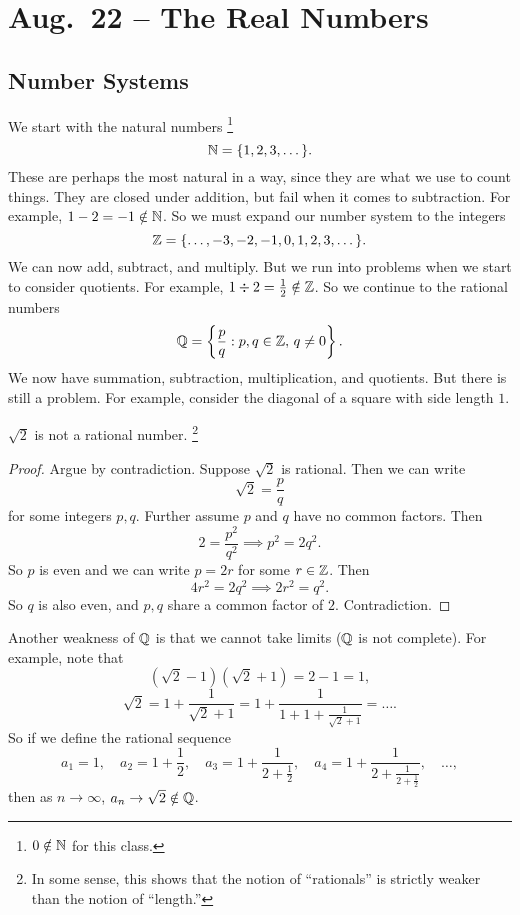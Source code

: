 \chapter{Aug.~22 -- The Real Numbers}

\section{Number Systems}
We start with the natural numbers
\footnote{$0 \notin \mathbb{N}$ for this class.}
\[\mathbb{N} = \{1, 2, 3, \dots\}.\]
These are perhaps
the most natural in a way, since they are what we use to
count things. They are closed under addition, but
fail when it comes to subtraction. For example,
$1 - 2 = -1 \notin \mathbb{N}$.
So we must expand our number system to the
integers
\[\mathbb{Z} = \{\dots, -3, -2, -1, 0, 1, 2, 3, \dots\}.\]
We can now add, subtract, and
multiply. But we run into problems when we start to
consider quotients. For example,
$1 \div 2 = \frac{1}{2} \notin \mathbb{Z}$.
So we continue to the rational numbers
\[\mathbb{Q} = \left\{\frac{p}{q} : p, q \in \mathbb{Z},\, q \ne 0\right\}.\]
We now have summation, subtraction,
multiplication, and quotients. But there is still a
problem. For example, consider the diagonal of a square
with side length $1$.

\begin{theorem}
  $\sqrt{2}$ is not a rational number. 
  \footnote{
    In some sense, this shows that the notion of
    ``rationals'' is strictly weaker than the notion of
    ``length.''
  }
\end{theorem}

\begin{proof}
  Argue by contradiction. Suppose $\sqrt{2}$ is rational.
  Then we can write
   \[
     \sqrt{2} = \frac{p}{q}
  \]
  for some integers $p, q$. Further assume $p$ and
  $q$ have no common factors. Then
  \[2 = \frac{p^2}{q^2} \implies p^2 = 2q^2.\]
  So $p$ is even and we can write $p = 2r$ for some
  $r \in \mathbb{Z}$. Then
  \[4r^2 = 2q^2 \implies 2r^2 = q^2.\]
  So $q$ is also even, and $p, q$ share a common factor
  of $2$. Contradiction.
\end{proof}

Another weakness of $\mathbb{Q}$ is that we cannot take limits
($\mathbb{Q}$ is not complete). For example, note that
\[(\sqrt{2} - 1)(\sqrt{2} + 1) = 2 - 1 = 1,\]
\[
  \sqrt{2} = 1 + \frac{1}{\sqrt{2} + 1}
  = 1 + \frac{1}{1 + 1 + \frac{1}{\sqrt{2} + 1}}
  = \dots
.\]
So if we define the rational sequence
\[
  a_1 = 1, \quad
  a_2 = 1 + \frac{1}{2}, \quad
  a_3 = 1 + \frac{1}{2 + \frac{1}{2}}, \quad
  a_4 = 1 + \frac{1}{2 + \frac{1}{2 + \frac{1}{2}}},
  \quad \dots
,\]
then as $n \to \infty$, $a_n \to \sqrt{2} \notin \mathbb{Q}$.

